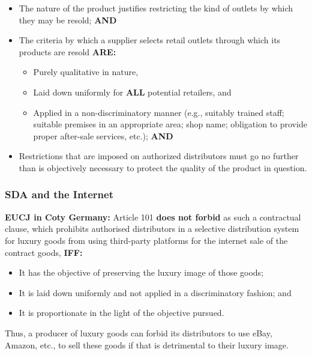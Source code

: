     \begin{itemize}
        \item The nature of the product justifies restricting the kind of outlets by which they may be resold; \textbf{AND}
        \item The criteria by which a supplier selects retail outlets through which its products are resold \textbf{ARE:}
        \begin{itemize}
            \item Purely qualitative in nature,
            \item Laid down uniformly for \textbf{ALL} potential retailers, and
            \item Applied in a non-discriminatory manner (e.g., suitably trained staff; suitable premises in an appropriate area; shop name; obligation to provide proper after-sale services, etc.); \textbf{AND}
        \end{itemize}
        \item Restrictions that are imposed on authorized distributors must go no further than is objectively necessary to protect the quality of the product in question.
    \end{itemize}

    \subsubsection{SDA and the Internet}

        \textbf{EUCJ in Coty Germany:} Article 101 \textbf{does not forbid} as such a contractual clause, which prohibits authorised distributors in a selective distribution system for luxury goods from using third-party platforms for the internet sale of the contract goods, \textbf{IFF:}
        
        \begin{itemize}
            \item It has the objective of preserving the luxury image of those goods;
            \item It is laid down uniformly and not applied in a discriminatory fashion; and
            \item It is proportionate in the light of the objective pursued.
        \end{itemize}
        
        Thus, a producer of luxury goods can forbid its distributors to use eBay, Amazon, etc., to sell these goods if that is detrimental to their luxury image.
        
